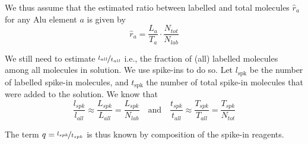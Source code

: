 \noindent We thus assume that the estimated ratio between labelled and total
molecules $\hat{r}_{a}$ for any Alu element $a$ is given by
\begin{equation*}
\hat{r}_{a}=\frac{L_{a}}{T_{a}}\cdot\frac{N_{tot}}{N_{lab}}
\end{equation*}

\noindent We still need to estimate $\nicefrac{l_{all}}{t_{all}}$ i.e., the
fraction of (all) labelled molecules among all molecules in solution. We use
spike-ins to do so. Let $l_{\text{spk}}$ be the number of labelled spike-in
molecules, and $t_{\text{spk}}$ the number of total spike-in molecules that were
added to the solution. We know that
\begin{equation}
\frac{l_{spk}}{l_{all}}\approx\frac{L_{spk}}{L_{all}}=\frac{L_{spk}}{N_{lab}}
\quad\text{and}\quad
\frac{t_{spk}}{t_{all}}\approx\frac{T_{spk}}{T_{all}}=\frac{T_{spk}}{N_{tot}}
\label{spk}
\end{equation}

\noindent The term $q=\nicefrac{l_{spk}}{t_{spk}}$ is thus known by composition
of the spike-in reagents.